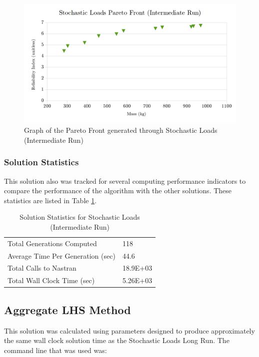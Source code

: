 \begin{figure}
\includegraphics[width=\textwidth]{img/pf_sto_int.png}
	\caption{Graph of the Pareto Front generated through Stochastic Loads (Intermediate Run)}
\label{fig:pfront_sto_int}
\end{figure}

\subsubsection{Solution Statistics}
This solution also was tracked for several computing performance indicators to compare the performance of the algorithm with the other solutions. These statistics are listed in Table \ref{tab:stat_sto_int}. 

\begin{table}[!htbp]
  \caption{Solution Statistics for Stochastic Loads (Intermediate Run)}
  \label{tab:stat_sto_int}
  \centering
  \begin{tabular}{|l|l|}
    \hline
	  Total Generations Computed & 118\\
    Average Time Per Generation (sec) & 44.6\\
    Total Calls to Nastran & 18.9E+03\\
    Total Wall Clock Time (sec)	 & 5.26E+03\\
    \hline
  \end{tabular}
\end{table}




\subsection{Aggregate LHS Method}
This solution was calculated using parameters designed to produce approximately the same wall clock solution time as the Stochastic Loads Long Run. The command line that was used was:

